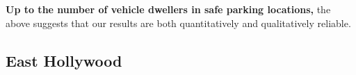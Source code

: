 \documentclass[11pt,twocolumn]{article}
\def\bfr{\bf\color{red}}
\begin{document}
%
%
%



{\bfr Up to the number of vehicle dwellers in safe parking locations,} the above suggests that our results 
are both quantitatively and qualitatively reliable.\\

\subsection{East Hollywood}
\label{sec:eHo}
\end{document}

